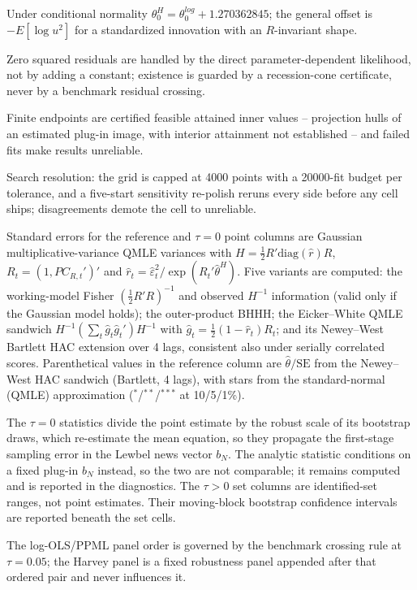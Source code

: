 \begin{table}[!htbp]
\begin{threeparttable}
\begin{tablenotes}[flushleft]
\item Under conditional normality $\theta^{H}_0 = \theta^{log}_0 + 1.270362845$; the general offset is $-E[\log u^2]$ for a standardized innovation with an $R$-invariant shape.
\item Zero squared residuals are handled by the direct parameter-dependent likelihood, not by adding a constant; existence is guarded by a recession-cone certificate, never by a benchmark residual crossing.
\item Finite endpoints are certified feasible attained inner values -- projection hulls of an estimated plug-in image, with interior attainment not established -- and failed fits make results unreliable.
\item Search resolution: the grid is capped at 4000 points with a 20000-fit budget per tolerance, and a five-start sensitivity re-polish reruns every side before any cell ships; disagreements demote the cell to unreliable.
\item Standard errors for the reference and $\tau{=}0$ point columns are Gaussian multiplicative-variance QMLE variances with $H = \frac{1}{2}R'\mathrm{diag}(\hat r)R$, $R_t = (1, PC_{R,t}')'$ and $\hat r_t = \hat\varepsilon_t^2 / \exp(R_t'\hat\theta^{H})$. Five variants are computed: the working-model Fisher $(\frac{1}{2}R'R)^{-1}$ and observed $H^{-1}$ information (valid only if the Gaussian model holds); the outer-product BHHH; the Eicker--White QMLE sandwich $H^{-1} (\sum_t \hat g_t \hat g_t')H^{-1}$ with $\hat g_t = \frac{1}{2}(1 - \hat r_t)R_t$; and its Newey--West Bartlett HAC extension over 4 lags, consistent also under serially correlated scores. Parenthetical values in the reference column are $\hat\theta/\mathrm{SE}$ from the Newey--West HAC sandwich (Bartlett, 4 lags), with stars from the standard-normal (QMLE) approximation ($^{*}$/$^{**}$/$^{***}$ at 10/5/1\%).
\item The $\tau{=}0$ statistics divide the point estimate by the robust scale of its bootstrap draws, which re-estimate the mean equation, so they propagate the first-stage sampling error in the Lewbel news vector $b_N$. The analytic statistic conditions on a fixed plug-in $b_N$ instead, so the two are not comparable; it remains computed and is reported in the diagnostics. The $\tau{>}0$ set columns are identified-set ranges, not point estimates. Their moving-block bootstrap confidence intervals are reported beneath the set cells.
\item The log-OLS/PPML panel order is governed by the benchmark crossing rule at $\tau{=}0.05$; the Harvey panel is a fixed robustness panel appended after that ordered pair and never influences it.

\end{tablenotes}
\end{threeparttable}
\end{table}
